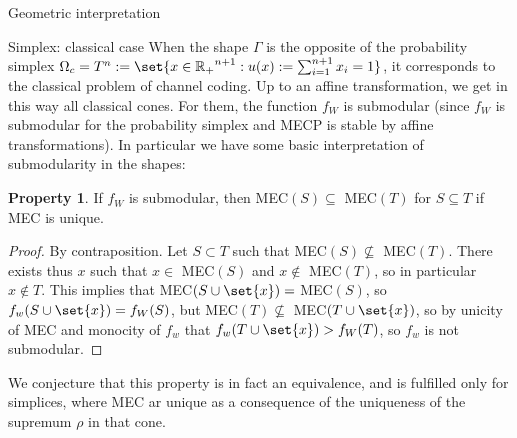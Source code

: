 \documentclass{article}
\theoremstyle{definition}
\newtheorem{prop}[theo]{Property}
\theoremstyle{remark}
\begin{document}
\begin{subsection}{Geometric interpretation}
  \begin{subsubsection}{Simplex: classical case}
    When the shape $\Gamma$ is the opposite of the probability simplex $\Omega_c = T^n := \set{x \in \mathbb{R_+}^{n+1} : u(x) := \sum_{i = 1}^{n+1} x_i = 1}$, it corresponds to the classical problem of channel coding. Up to an affine transformation, we get in this way all classical cones. For them, the function $f_W$ is submodular (since $f_W$ is submodular for the probability simplex and MECP is stable by affine transformations). In particular we have some basic interpretation of submodularity in the shapes:
    \begin{prop}
      If $f_W$ is submodular, then MEC$(S) \subseteq$ MEC$(T)$ for $S \subseteq T$ if MEC is unique.
    \end{prop}

    \begin{proof}
      By contraposition. Let $S \subset T$ such that MEC$(S) \not\subseteq$ MEC$(T)$. There exists thus $x$ such that $x \in$ MEC$(S)$ and $x \not\in$ MEC$(T)$, so in particular $x \not\in T$. This implies that MEC$(S\cup\set{x}) =$ MEC$(S)$, so $f_w(S\cup\set{x}) = f_W(S)$, but MEC$(T) \not\subseteq$ MEC$(T\cup\set{x})$, so by unicity of MEC and monocity of $f_w$ that $f_w(T\cup\set{x}) > f_W(T)$, so $f_w$ is not submodular.
    \end{proof}

    We conjecture that this property is in fact an equivalence, and is fulfilled only for simplices, where MEC ar unique as a consequence of the uniqueness of the supremum $\rho$ in that cone.


\end{subsubsection}
\end{subsection}
\end{document}
